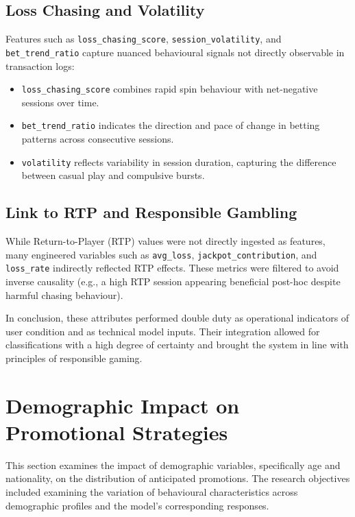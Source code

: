 \documentclass[12pt,a4paper]{report}
\begin{document}
\subsection*{Loss Chasing and Volatility}
Features such as \texttt{loss\_chasing\_score}, \texttt{session\_volatility}, and \texttt{bet\_trend\_ratio} capture nuanced behavioural signals not directly observable in transaction logs:
\begin{itemize}
    \item \texttt{loss\_chasing\_score} combines rapid spin behaviour with net-negative sessions over time.
    \item \texttt{bet\_trend\_ratio} indicates the direction and pace of change in betting patterns across consecutive sessions.
    \item \texttt{volatility} reflects variability in session duration, capturing the difference between casual play and compulsive bursts.
\end{itemize}

\subsection*{Link to RTP and Responsible Gambling}
While Return-to-Player (RTP) values were not directly ingested as features, many engineered variables such as \texttt{avg\_loss}, \texttt{jackpot\_contribution}, and \texttt{loss\_rate} indirectly reflected RTP effects. These metrics were filtered to avoid inverse causality (e.g., a high RTP session appearing beneficial post-hoc despite harmful chasing behaviour).

In conclusion, these attributes performed double duty as operational indicators of user condition and as technical model inputs.  Their integration allowed for classifications with a high degree of certainty and brought the system in line with principles of responsible gaming.


\section{Demographic Impact on Promotional Strategies}
\label{sec:demographic_promo_analysis}

This section examines the impact of demographic variables, specifically age and nationality, on the distribution of anticipated promotions.  The research objectives included examining the variation of behavioural characteristics across demographic profiles and the model's corresponding responses.
\end{document}

